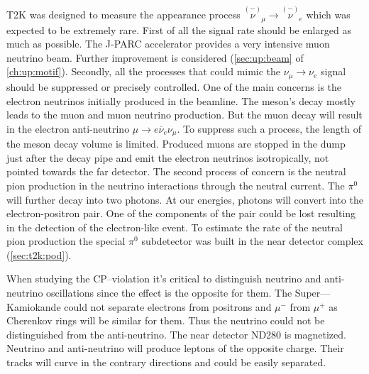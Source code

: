 \documentclass[../main.tex]{subfiles}
\begin{document}
T2K was designed to measure the appearance process $\overset{\scriptscriptstyle(-)}{\nu}_\mu\to\overset{\scriptscriptstyle(-)}{\nu}_e$ which was expected to be extremely rare. First of all the signal rate should be enlarged as much as possible. The J-PARC accelerator provides a very intensive muon neutrino beam. Further improvement is considered (\autoref{sec:up:beam} of \autoref{ch:up:motif}). Secondly, all the processes that could mimic the $\nu_\mu\to\nu_e$ signal should be suppressed or precisely controlled. One of the main concerns is the electron neutrinos initially produced in the beamline. The meson's decay mostly leads to the muon and muon neutrino production. But the muon decay will result in the electron anti-neutrino $\mu\to e\overline{\nu}_e\nu_\mu$. To suppress such a process, the length of the meson decay volume is limited. Produced muons are stopped in the dump just after the decay pipe and emit the electron neutrinos isotropically, not pointed towards the far detector. The second process of concern is the neutral pion production in the neutrino interactions through the neutral current. The $\pi^0$ will further decay into two photons. At our energies, photons will convert into the electron-positron pair. One of the components of the pair could be lost resulting in the detection of the electron-like event. To estimate the rate of the neutral pion production the special $\pi^0$ subdetector was built in the near detector complex (\autoref{sec:t2k:pod}).

When studying the CP--violation it's critical to distinguish neutrino and anti-neutrino oscillations since the effect is the opposite for them. The Super---Kamiokande could not separate electrons from positrons and $\mu^-$ from $\mu^+$ as Cherenkov rings will be similar for them. Thus the neutrino could not be distinguished from the anti-neutrino. The near detector ND280 is magnetized. Neutrino and anti-neutrino will produce leptons of the opposite charge. Their tracks will curve in the contrary directions and could be easily separated.
\end{document}
